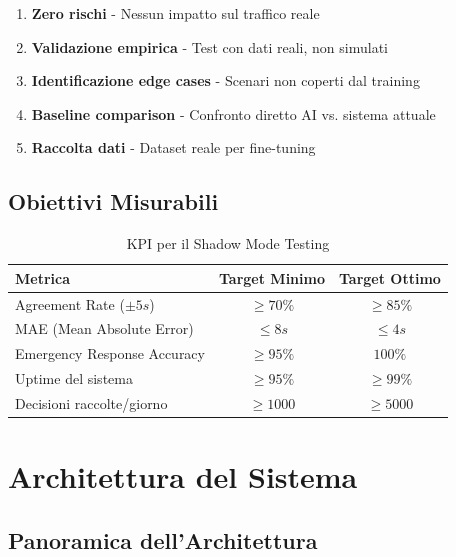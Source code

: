 \documentclass[a4paper,11pt]{article}
\begin{document}
\begin{enumerate}
    \item \textbf{Zero rischi} - Nessun impatto sul traffico reale
    \item \textbf{Validazione empirica} - Test con dati reali, non simulati
    \item \textbf{Identificazione edge cases} - Scenari non coperti dal training
    \item \textbf{Baseline comparison} - Confronto diretto AI vs. sistema attuale
    \item \textbf{Raccolta dati} - Dataset reale per fine-tuning
\end{enumerate}

\subsection{Obiettivi Misurabili}

\begin{table}[H]
    \centering
    \begin{tabular}{lcc}
        \toprule
        \textbf{Metrica} & \textbf{Target Minimo} & \textbf{Target Ottimo} \\
        \midrule
        Agreement Rate ($\pm 5s$) & $\geq 70\%$ & $\geq 85\%$ \\
        MAE (Mean Absolute Error) & $\leq 8s$ & $\leq 4s$ \\
        Emergency Response Accuracy & $\geq 95\%$ & $100\%$ \\
        Uptime del sistema & $\geq 95\%$ & $\geq 99\%$ \\
        Decisioni raccolte/giorno & $\geq 1000$ & $\geq 5000$ \\
        \bottomrule
    \end{tabular}
    \caption{KPI per il Shadow Mode Testing}
\end{table}

\section{Architettura del Sistema}

\subsection{Panoramica dell'Architettura}
\end{document}
